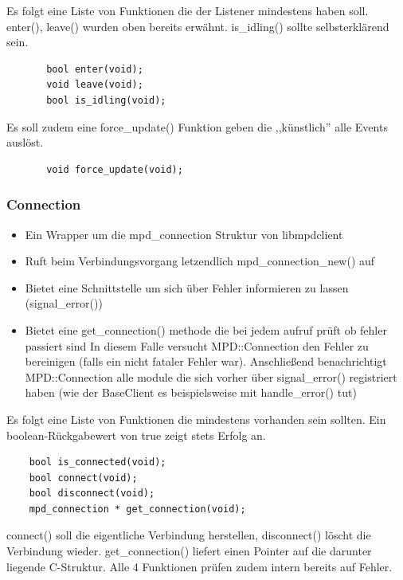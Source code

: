Es folgt eine Liste von Funktionen die der Listener mindestens haben soll.
\\
enter(), leave() wurden oben bereits erwähnt. 
is\_idling() sollte selbsterklärend sein.
\begin{verbatim}
       bool enter(void);
       void leave(void);
       bool is_idling(void);
\end{verbatim}

Es soll zudem eine force\_update() Funktion geben die ,,künstlich'' alle Events auslöst.
\begin{verbatim}
       void force_update(void);
\end{verbatim}

\subsubsection{Connection}
\begin{itemize}
    \item Ein Wrapper um die mpd\_connection Struktur von libmpdclient
    \item Ruft beim Verbindungsvorgang letzendlich mpd\_connection\_new() auf 
    \item Bietet eine Schnittstelle um sich über Fehler informieren zu lassen (signal\_error())
    \item Bietet eine get\_connection() methode die bei jedem aufruf prüft ob fehler passiert sind
        In diesem Falle versucht MPD::Connection den Fehler zu bereinigen (falls ein nicht fataler Fehler war).
        Anschließend benachrichtigt MPD::Connection alle module die sich vorher über signal\_error() 
        registriert haben (wie der BaseClient es beispielsweise mit handle\_error() tut)
\end{itemize}
Es folgt eine Liste von Funktionen die mindestens vorhanden sein sollten.
Ein boolean-Rückgabewert von true zeigt stets Erfolg an.
\\
\begin{verbatim}
    bool is_connected(void);
    bool connect(void);
    bool disconnect(void);
    mpd_connection * get_connection(void);
\end{verbatim}

connect() soll die eigentliche Verbindung herstellen, disconnect() löscht die Verbindung wieder.
get\_connection() liefert einen Pointer auf die darunter liegende C-Struktur. Alle 4 Funktionen prüfen 
zudem intern bereits auf Fehler.
\\

